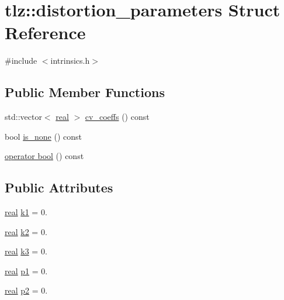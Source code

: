\hypertarget{structtlz_1_1distortion__parameters}{}\section{tlz\+:\+:distortion\+\_\+parameters Struct Reference}
\label{structtlz_1_1distortion__parameters}


{\ttfamily \#include $<$intrinsics.\+h$>$}

\subsection*{Public Member Functions}
\begin{DoxyCompactItemize}
\item 
std\+::vector$<$ \hyperlink{namespacetlz_a15fd37cce97f2b8b606af18c2615f602}{real} $>$ \hyperlink{structtlz_1_1distortion__parameters_a96312c5d7baa4b7b1f2a76e9396037f8}{cv\+\_\+coeffs} () const 
\item 
bool \hyperlink{structtlz_1_1distortion__parameters_a307fee036b04519d633fb8456899850c}{is\+\_\+none} () const 
\item 
\hyperlink{structtlz_1_1distortion__parameters_af81eafdc705c1c91af0bfa6a6e0c7e8d}{operator bool} () const 
\end{DoxyCompactItemize}
\subsection*{Public Attributes}
\begin{DoxyCompactItemize}
\item 
\hyperlink{namespacetlz_a15fd37cce97f2b8b606af18c2615f602}{real} \hyperlink{structtlz_1_1distortion__parameters_a3763e9aa237944173a55cf42e9259662}{k1} = 0.
\item 
\hyperlink{namespacetlz_a15fd37cce97f2b8b606af18c2615f602}{real} \hyperlink{structtlz_1_1distortion__parameters_af68e774f6af83517048c48a2d6880466}{k2} = 0.
\item 
\hyperlink{namespacetlz_a15fd37cce97f2b8b606af18c2615f602}{real} \hyperlink{structtlz_1_1distortion__parameters_a498f99e384cb7e4e0b94eb20bdf988d6}{k3} = 0.
\item 
\hyperlink{namespacetlz_a15fd37cce97f2b8b606af18c2615f602}{real} \hyperlink{structtlz_1_1distortion__parameters_a129d1ec5b0f94a1936c042d1b17a8735}{p1} = 0.
\item 
\hyperlink{namespacetlz_a15fd37cce97f2b8b606af18c2615f602}{real} \hyperlink{structtlz_1_1distortion__parameters_a1869618a7c2b3438a20fc488ccf4d818}{p2} = 0.
\end{DoxyCompactItemize}


